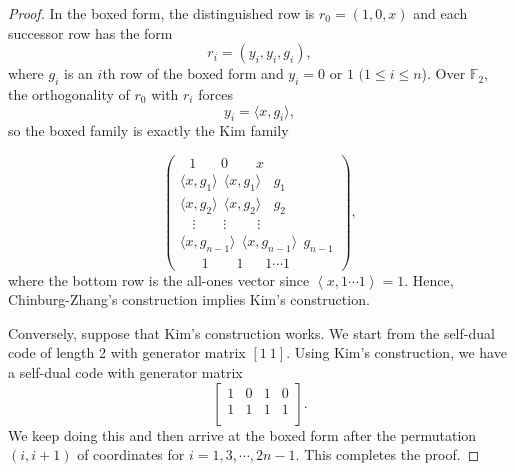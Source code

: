 \documentclass[12pt]{article}
\begin{document}
\begin{proof}
In the boxed form, the distinguished row is $r_0=(1,0,x)$ and each successor row has the form
\[
r_i=(y_i,y_i,g_i),
\]
where $g_i$ is an $i$th row of the boxed form and $y_i = 0$ or $1$ $(1 \le i \le n$).
Over $\mathbb F_2$, the orthogonality of $r_0$ with $r_i$ forces
\[
y_i=\langle x,g_i\rangle,
\]
so the boxed family is exactly the Kim family


\[
\begin{pmatrix}
~~~1 ~~~~~~~~ 0 ~~~~~~~~~ x  \\
\langle x,g_1\rangle ~~\langle x,g_1\rangle ~~~~g_1 \\
\langle x,g_2\rangle ~~\langle x,g_2\rangle ~~~~g_2 \\
~~~~\vdots ~~~~~~~~~ \vdots ~~~~~~~~~~\vdots ~~\\
\langle x,g_{n-1}\rangle ~~\langle x,g_{n-1}\rangle ~~g_{n-1} \\
~~~~~~~1~~~~~~~~~1  ~~~~~ ~~1 \cdots 1
\end{pmatrix},
\]
where the bottom row is the all-ones vector since $\left<x, 1\cdots 1 \right> =1$.
Hence, Chinburg-Zhang's construction implies Kim's construction.

Conversely, suppose that Kim's construction works. We start from the self-dual code of length 2 with generator matrix $[1~1]$. Using Kim's construction, we have a self-dual code with generator matrix
\[
\left[
\begin{array}{cccc}
1 & 0 & 1 & 0 \\
1 & 1& 1 & 1 \\
\end{array}
\right].
\]
We keep doing this and then arrive at the boxed form after the permutation
$(i, i+1)$ of coordinates for $i=1, 3, \cdots, 2n-1$.
This completes the proof.
\end{proof}
\end{document}
